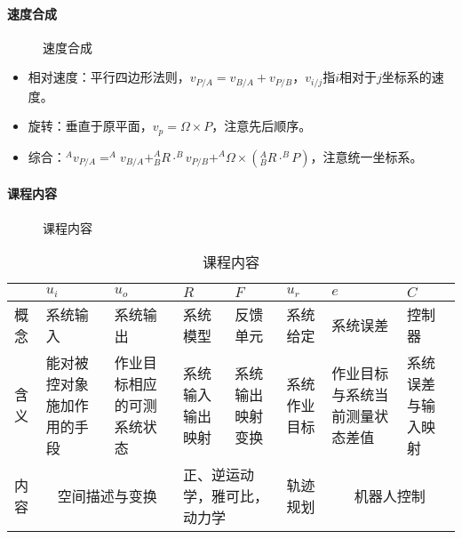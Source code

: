 \documentclass[
12pt, %
a4paper, 
oneside, %
headinclude,footinclude, %
]{scrartcl}
\begin{document}
\paragraph{速度合成}
\begin{figure}[H]
\centering
{} \quad
{}
\caption[速度合成]{速度合成}
\end{figure}

\begin{itemize}
\item 相对速度：平行四边形法则，$ v_{P/A} = v_{B/A} + v_{P/B} $，$ v_{i/j} $指$ i $相对于$ j $坐标系的速度。
\item 旋转：垂直于原平面，$ v_p = \Omega \times P $，注意先后顺序。
\item 综合：$ ^A v_{P/A} = ^A v_{B/A} + ^A_B R \cdot ^B v_{P/B} + ^A \Omega \times (^A_B R \cdot ^B P) $，注意统一坐标系。
\end{itemize}
\paragraph{课程内容}
\begin{figure}[H]
\centering
{} \quad
{}
\caption[课程内容]{课程内容}
\end{figure}

\begin{table}[hbt]
\caption{课程内容}
\centering
\begin{tabular}{|p{0.5cm}|p{2cm}|p{2cm}|p{2cm}|p{2cm}|p{2cm}|p{2cm}|p{2cm}|}
\hline
& $ u_i $ & $ u_o $ & $ R $ & $ F $ & $ u_r $ & $ e $ & $ C $ \\
\hline
概念 & 系统输入 & 系统输出 & 系统模型 & 反馈单元 & 系统给定 & 系统误差 & 控制器 \\
\hline
含义 & 能对被控对象施加作用的手段 & 作业目标相应的可测系统状态 & 系统输入输出映射 & 系统输出映射变换 & 系统作业目标 & 作业目标与系统当前测量状态差值 & 系统误差与输入映射 \\
\hline
内容 & \multicolumn{2}{c|}{空间描述与变换} & \multicolumn{2}{p{4cm}|}{正、逆运动学，雅可比，动力学} & 轨迹规划 & \multicolumn{2}{c|}{机器人控制} \\
\hline
\end{tabular}
\end{table}
\end{document}
